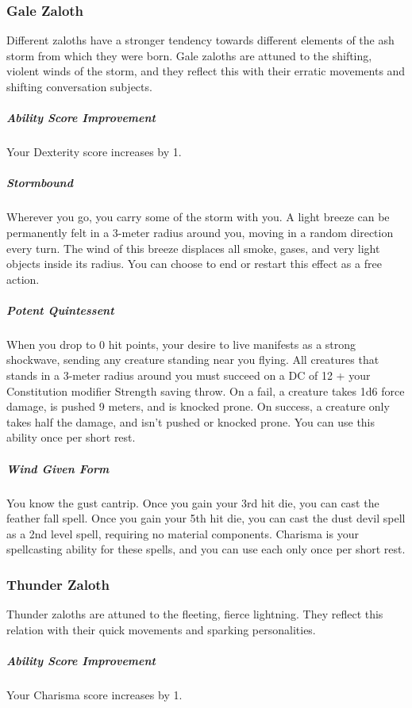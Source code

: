 \subsubsection{Gale Zaloth}
    Different zaloths have a stronger tendency towards different elements of the ash storm from which they were born.
    Gale zaloths are attuned to the shifting, violent winds of the storm, and they reflect this with their erratic movements and shifting conversation subjects.

    \subparagraph{Ability Score Improvement} Your Dexterity score increases by 1.

    \subparagraph{Stormbound} Wherever you go, you carry some of the storm with you.
    A light breeze can be permanently felt in a 3-meter radius around you, moving in a random direction every turn.
    The wind of this breeze displaces all smoke, gases, and very light objects inside its radius.
    You can choose to end or restart this effect as a free action.

    \subparagraph{Potent Quintessent} When you drop to 0 hit points, your desire to live manifests as a strong shockwave, sending any creature standing near you flying.
    All creatures that stands in a 3-meter radius around you must succeed on a DC of 12 + your Constitution modifier Strength saving throw.
    On a fail, a creature takes 1d6 force damage, is pushed 9 meters, and is knocked prone.
    On success, a creature only takes half the damage, and isn't pushed or knocked prone.
    You can use this ability once per short rest.

    \subparagraph{Wind Given Form} You know the gust cantrip.
    Once you gain your 3rd hit die, you can cast the feather fall spell.
    Once you gain your 5th hit die, you can cast the dust devil spell as a 2nd level spell, requiring no material components.
    Charisma is your spellcasting ability for these spells, and you can use each only once per short rest.

\subsubsection{Thunder Zaloth}
    Thunder zaloths are attuned to the fleeting, fierce lightning.
    They reflect this relation with their quick movements and sparking personalities.

    \subparagraph{Ability Score Improvement} Your Charisma score increases by 1.

